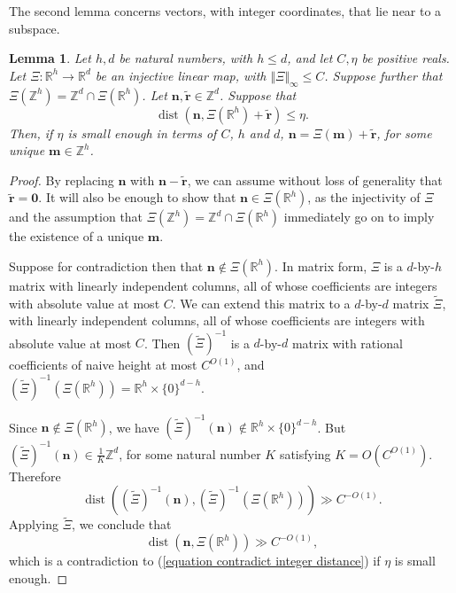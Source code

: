 \documentclass[12pt,a4paper,twoside,reqno]{amsart}
\newtheorem{Lemma}[Theorem]{Lemma}
\newcommand{\dist}{\operatorname{dist}}
\numberwithin{equation}{section}
\begin{document}
The second lemma concerns vectors, with integer coordinates, that lie near to a subspace. 
\begin{Lemma}
\label{Lemma integer distance}
Let $h,d$ be natural numbers, with $h\leqslant d$, and let $C,\eta$ be positive reals. Let $\Xi:\mathbb{R}^h \longrightarrow \mathbb{R}^d$ be an injective linear map, with $\Vert \Xi\Vert_\infty \leqslant C$.  Suppose further that $\Xi(\mathbb{Z}^h) = \mathbb{Z}^d \cap \Xi(\mathbb{R}^h)$. Let $\mathbf{n},\widetilde{\mathbf{r}}\in \mathbb{Z}^d$. Suppose that 
\begin{equation}
\label{equation contradict integer distance}
 \dist(\mathbf{n} , \Xi(\mathbb{R}^h) + \widetilde{\mathbf{r}}) \leqslant \eta.
 \end{equation}
 Then, if $\eta$ is small enough in terms of $C$, $h$ and $d$, $\mathbf{n} = \Xi(\mathbf{m})+ \widetilde{\mathbf{r}}$, for some unique $\mathbf{m} \in\mathbb{Z}^h$.    
\end{Lemma}
\begin{proof}
By replacing $\mathbf{n}$ with $\mathbf{n} - \widetilde{\mathbf{r}}$, we can assume without loss of generality that $\widetilde{\mathbf{r}} = \mathbf{0}$. It will also be enough to show that $\mathbf{n} \in \Xi(\mathbb{R}^h)$, as the injectivity of $\Xi$ and the assumption that $\Xi(\mathbb{Z}^h) = \mathbb{Z}^d \cap \Xi(\mathbb{R}^h)$ immediately go on to imply the existence of a unique $\mathbf{m}$.

Suppose for contradiction then that $\mathbf{n} \notin \Xi(\mathbb{R}^h)$. In matrix form, $\Xi$ is a $d$-by-$h$ matrix with linearly independent columns, all of whose coefficients are integers with absolute value at most $C$. We can extend this matrix to a $d$-by-$d$ matrix $\widetilde{\Xi}$, with linearly independent columns, all of whose coefficients are integers with absolute value at most $C$. Then $(\widetilde{\Xi})^{-1}$ is a $d$-by-$d$ matrix with rational coefficients of naive height at most $C^{O(1)}$, and $(\widetilde{\Xi})^{-1}(\Xi(\mathbb{R}^{h})) = \mathbb{R}^h \times \{0\}^{d-h}$. 

Since $\mathbf{n} \notin \Xi(\mathbb{R}^h)$, we have $(\widetilde{\Xi})^{-1}(\mathbf{n})\notin \mathbb{R}^h \times \{0\}^{d-h}$.  But $(\widetilde{\Xi})^{-1}(\mathbf{n}) \in \frac{1}{K} \mathbb{Z}^d$, for some natural number $K$ satisfying $K = O(C^{O(1)})$. Therefore \[ \dist ( (\widetilde{\Xi})^{-1}(\mathbf{n}),(\widetilde{\Xi})^{-1}(\Xi(\mathbb{R}^{h}))) \gg C^{-O(1)}.\] Applying $\widetilde{\Xi}$, we conclude that \[ \dist(\mathbf{n} , \Xi(\mathbb{R}^h)) \gg C^{-O(1)},\] which is a contradiction to (\ref{equation contradict integer distance}) if $\eta$ is small enough. 
\end{proof}
\end{document}
